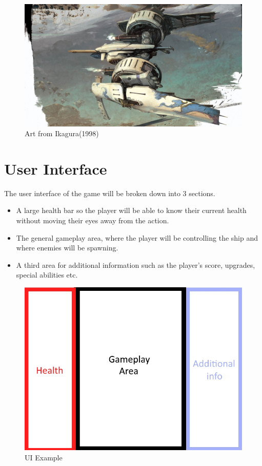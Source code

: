 \documentclass[a4paper]{scrreprt}
\begin{document}
\begin{figure}[h!]
  \centering
  \includegraphics[width=1\textwidth]{Ikagura}
  \caption{\label{fig:art}Art from Ikagura(1998)}
  \end{figure}

\clearpage

\section{User Interface}
The user interface of the game will be broken down into 3 sections. 
\begin{itemize}
  \item A large health bar so the player will be able to know their current health without moving their eyes away from the action. 
  \item The general gameplay area, where the player will be controlling the ship and where enemies will be spawning. 
  \item A third area for additional information such as the player's score, upgrades, special abilities etc.
\end{itemize}

\begin{figure}[h]
  \centering
  \includegraphics[width=1\textwidth]{UI}
  \caption{\label{fig:art}UI Example}
  \end{figure}
\end{document}
